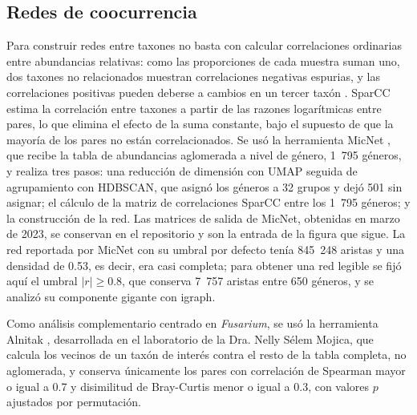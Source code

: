 \subsection{Redes de coocurrencia}

Para construir redes entre taxones no basta con calcular correlaciones ordinarias entre
abundancias relativas: como las proporciones de cada muestra suman uno, dos taxones no relacionados
muestran correlaciones negativas espurias, y las correlaciones positivas pueden deberse a cambios en
un tercer taxón \citep{gloor2017microbiome}. SparCC \citep{friedman2012inferring} estima la
correlación entre taxones a partir de las razones logarítmicas entre pares, lo que elimina el
efecto de la suma constante, bajo el supuesto de que la mayoría de los pares no están
correlacionados. Se usó la herramienta MicNet \citep{favila2022micnet}, que recibe la tabla de
abundancias aglomerada a nivel de género, 1~795 géneros, y realiza tres pasos: una reducción de
dimensión con UMAP \citep{mcinnes2018umap} seguida de agrupamiento con HDBSCAN, que asignó los
géneros a 32 grupos y dejó 501 sin asignar; el cálculo de la matriz de correlaciones SparCC entre
los 1~795 géneros; y la construcción de la red. Las matrices de salida de MicNet, obtenidas en
marzo de 2023, se conservan en el repositorio y son la entrada de la figura que sigue. La red
reportada por MicNet con su umbral por defecto tenía 845~248 aristas y una densidad de 0.53, es
decir, era casi completa; para obtener una red legible se fijó aquí el umbral $|r| \geq 0.8$,
que conserva 7~757 aristas entre 650 géneros, y se analizó su componente gigante con igraph.

Como análisis complementario centrado en \textit{Fusarium}, se usó la herramienta Alnitak
\citep{alnitak2023}, desarrollada en el laboratorio de la Dra. Nelly Sélem Mojica, que
calcula los vecinos de un taxón de interés contra el resto de la tabla completa, no aglomerada,
y conserva únicamente los pares con correlación de Spearman mayor o igual a 0.7 y disimilitud de
Bray-Curtis menor o igual a 0.3, con valores $p$ ajustados por permutación.

